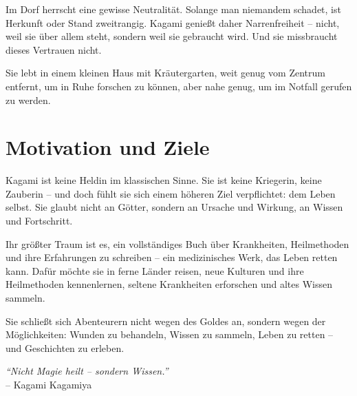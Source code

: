 \documentclass[12pt,a4paper]{article}
\begin{document}
Im Dorf herrscht eine gewisse Neutralität. Solange man niemandem schadet, ist Herkunft oder Stand zweitrangig. Kagami genießt daher Narrenfreiheit – nicht, weil sie über allem steht, sondern weil sie gebraucht wird. Und sie missbraucht dieses Vertrauen nicht.

Sie lebt in einem kleinen Haus mit Kräutergarten, weit genug vom Zentrum entfernt, um in Ruhe forschen zu können, aber nahe genug, um im Notfall gerufen zu werden.

\newpage

\section{Motivation und Ziele}

Kagami ist keine Heldin im klassischen Sinne. Sie ist keine Kriegerin, keine Zauberin – und doch fühlt sie sich einem höheren Ziel verpflichtet: dem Leben selbst. Sie glaubt nicht an Götter, sondern an Ursache und Wirkung, an Wissen und Fortschritt.

Ihr größter Traum ist es, ein vollständiges Buch über Krankheiten, Heilmethoden und ihre Erfahrungen zu schreiben – ein medizinisches Werk, das Leben retten kann. Dafür möchte sie in ferne Länder reisen, neue Kulturen und ihre Heilmethoden kennenlernen, seltene Krankheiten erforschen und altes Wissen sammeln.

Sie schließt sich Abenteurern nicht wegen des Goldes an, sondern wegen der Möglichkeiten: Wunden zu behandeln, Wissen zu sammeln, Leben zu retten – und Geschichten zu erleben.

\newpage

\vfill

\begin{center}
    \textit{“Nicht Magie heilt – sondern Wissen.”} \\
    -- Kagami Kagamiya
\end{center}
\end{document}
